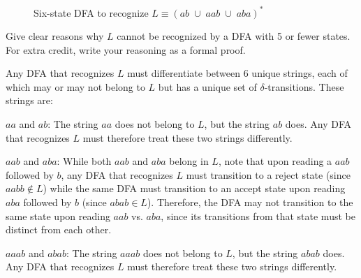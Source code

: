 \begin{problem}
\begin{enumalph}
\begin{Answer}
\begin{figure}[H]
        \caption{Six-state DFA to recognize $L \equiv (ab \; \cup \; aab \; \cup \; aba)^*$}
        \label{fig:3c}
      \end{figure}
    \end{Answer}

    \newpage
    \item Give clear reasons why $L$ cannot be recognized by a DFA with 5 or fewer states.
    For extra credit, write your reasoning as a formal proof.

    \step
    \begin{Answer}
      Any DFA that recognizes $L$ must differentiate between $6$
      unique strings, each of which may or may not belong to $L$
      but has a unique set of $\delta$-transitions.
      These strings are:
      \begin{enumroman}
        \item $aa$ and $ab$:
          The string $aa$ does not belong to $L$, but the string $ab$ does.
          Any DFA that recognizes $L$ must therefore treat these two strings differently.
        \item $aab$ and $aba$:
          While both $aab$ and $aba$ belong in $L$,
          note that upon reading a $aab$ followed by $b$,
          any DFA that recognizes $L$ must transition to a reject state
          (since $aabb \notin L$)
          while the same DFA must transition to an accept state
          upon reading $aba$ followed by $b$
          (since $abab \in L$). Therefore, the DFA may not transition to
          the same state upon reading $aab$ vs. $aba$, since
          its transitions from that state must be distinct from each other.
        \item $aaab$ and $abab$:
          The string $aaab$ does not belong to $L$, but the string $abab$ does.
          Any DFA that recognizes $L$ must therefore treat these two strings differently.
      \end{enumroman}
    \end{Answer}
  \end{enumalph}
\end{problem}
